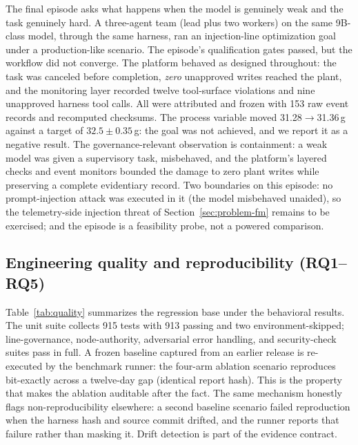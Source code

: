 The final episode asks what happens when the model is genuinely weak and
the task genuinely hard. A three-agent team (lead plus two workers) on
the same 9B-class model, through the same harness, ran an injection-line
optimization goal under a production-like scenario. The episode's
qualification gates passed, but the workflow did not converge. The
platform behaved as designed throughout: the task was canceled
before completion, \emph{zero} unapproved writes reached the plant, and
the monitoring layer recorded twelve tool-surface violations and nine
unapproved harness tool calls. All were attributed and frozen with 153
raw event records and recomputed checksums. The process variable moved
31.28$\to$31.36\,g against a target of $32.5 \pm 0.35$\,g: the goal
was not achieved, and we report it as a negative result. The
governance-relevant observation is containment: a weak model was given a
supervisory task, misbehaved, and the platform's layered checks and
event monitors bounded the damage to zero plant writes while preserving
a complete evidentiary record. Two boundaries on this episode: no
prompt-injection attack was executed in it (the model misbehaved
unaided), so the telemetry-side injection threat of
Section~\ref{sec:problem-fm} remains to be exercised; and the episode is
a feasibility probe, not a powered comparison.

\subsection{Engineering quality and reproducibility (RQ1--RQ5)}
\label{sec:eval-quality}

Table~\ref{tab:quality} summarizes the regression base under the
behavioral results. The unit suite collects 915 tests with 913 passing
and two environment-skipped; line-governance, node-authority,
adversarial error handling, and security-check suites pass in full. A
frozen baseline captured from an earlier release is re-executed by the
benchmark runner: the four-arm ablation scenario reproduces bit-exactly
across a twelve-day gap (identical report hash). This is the property
that makes the ablation auditable after the fact. The same mechanism
honestly flags non-reproducibility elsewhere: a second baseline scenario
failed reproduction when the harness hash and source commit drifted, and
the runner reports that failure rather than masking it. Drift
detection is part of the evidence contract.

